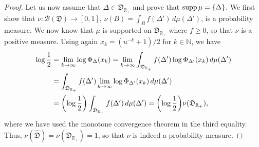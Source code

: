 \documentclass[12pt,a4paper,reqno]{amsart}
\theoremstyle{definition}
\newcommand{\mc}[1]{\mathcal{#1}}
\newcommand{\mf}[1]{\mathfrak{#1}}
\newcommand{\N}{\mathbb N}
\newcommand{\R}{\mathbb R}
\let\originalleft\left
\let\originalright\right
\renewcommand{\left}{\mathopen{}\mathclose\bgroup\originalleft}
\renewcommand{\right}{\aftergroup\egroup\originalright}
\begin{document}
\begin{proof}

Let us now assume that $\Delta\in\mf D_{\R_+}$ and prove that ${\rm supp}\,\mu=\{\Delta\}$. We first show that $\nu:\mc B(\mf D)\to[0,1]$, $\nu(B)=\int_B f(\Delta')\,d\mu(\Delta')$, is a probability measure. We now know that $\mu$ is supported on $\mf D_{\R_+}$ where $f\geq0$, so that $\nu$ is a positive measure. Using again $x_k=(u^{-k}+1)/2$ for $k\in\N$, we have
\begin{align*}
\log{\frac{1}{2}}&=\lim_{k\to\infty}\log{\Phi_\Delta(x_k)}=\lim_{k\to\infty}\int_{\mf D_{\R_+}}f(\Delta')\log{\Phi_{\Delta'}(x_k)}\,d\mu(\Delta')\\
&=\int_{\mf D_{\R_+}}f(\Delta')\lim_{k\to\infty}\log{\Phi_{\Delta'}(x_k)}\,d\mu(\Delta')\\
&=\left(\log{\frac{1}{2}}\right)\int_{\mf D_{\R_+}}f(\Delta')\,d\mu(\Delta')=\left(\log{\frac{1}{2}}\right)\nu(\mf D_{\R_+}),
\end{align*}
where we have used the monotone convergence theorem in the third equality. Thus, $\nu(\hat{\mf D})=\nu(\mf D_{\R_+})=1$, so that $\nu$ is indeed a probability measure.


\end{proof}
\end{document}
